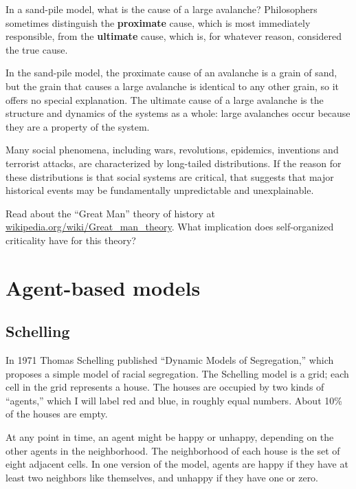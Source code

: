 \documentclass[10pt]{book}
\begin{document}
In a sand-pile model, what is the cause of a large avalanche?
Philosophers sometimes distinguish the {\bf proximate} cause, which is
most immediately responsible, from the {\bf ultimate} cause, which is,
for whatever reason, considered the true cause.

In the sand-pile model, the proximate cause of an avalanche is
a grain of sand, but the grain that causes a large avalanche
is identical to any other grain, so it offers no special explanation.
The ultimate cause of a large avalanche is the structure and
dynamics of the systems as a whole: large avalanches occur because
they are a property of the system.

Many social phenomena, including wars, revolutions, epidemics,
inventions and terrorist attacks, are characterized by long-tailed
distributions.  If the reason for these distributions is that
social systems are critical, that suggests that major historical
events may be fundamentally unpredictable and unexplainable.

\begin{ex}

Read about the ``Great Man'' theory of history at
\url{wikipedia.org/wiki/Great_man_theory}.  What implication
does self-organized criticality have for this theory?

\end{ex}


\chapter{Agent-based models}

\section{Schelling}


In 1971 Thomas Schelling published ``Dynamic Models of Segregation,''
which proposes a simple model of racial segregation.
The Schelling model is a grid; each cell in the grid represents
a house.
The houses are occupied by two kinds of ``agents,'' which I will label
red and blue, in roughly equal numbers.  About 10\% of the houses are
empty.

At any point in time, an agent might be happy or unhappy, depending
on the other agents in the neighborhood.
The neighborhood of each house is the set of
eight adjacent cells.
In one version of the model, agents are happy if they have at least
two neighbors like themselves, and unhappy if they have one or zero.
\end{document}
